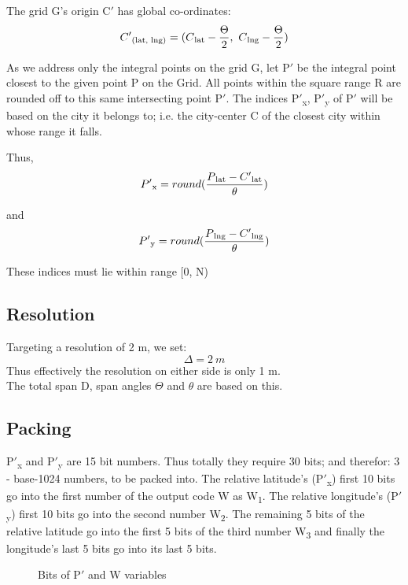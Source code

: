 \documentclass[conference]{IEEEtran}
\begin{document}
The grid G's origin C$'$ has global co-ordinates:
\begin{equation}C'\textsubscript{(lat, lng)} = ( C\textsubscript{lat} - \frac{\Theta}{2},\ C\textsubscript{lng} - \frac{\Theta}{2})\end{equation}

As we address only the integral points on the grid G, let P$'$ be the integral point closest to the given point P on the Grid.
All points within the square range R are rounded off to this same intersecting point P$'$.
The indices P$'$\textsubscript{x}, P$'$\textsubscript{y} of P$'$ will be based on the city it belongs to;
i.e. the city-center C of the closest city within whose range it falls.


Thus, \begin{equation}P'\textsubscript{x} = round(\frac{P\textsubscript{lat} - C'\textsubscript{lat}} {\theta})\end{equation}

and \begin{equation}P'\textsubscript{y}= round(\frac{P\textsubscript{lng} - C'\textsubscript{lng}} {\theta})\end{equation}

These indices must lie within range [0, N)

\subsection{Resolution}
Targeting a resolution of 2 m, we set:
\begin{equation}\Delta = 2 \ m\end{equation}
Thus effectively the resolution on either side is only 1 m.\\
The total span D, span angles $\Theta$ and {$\theta$} are based on this.

\subsection{Packing}
P$'$\textsubscript{x} and P$'$\textsubscript{y} are 15 bit numbers.
Thus totally they require 30 bits; and therefor: 3 - base-1024 numbers, to be packed into.
The relative latitude's (P$'$\textsubscript{x}) first 10 bits go into the first number of the output code W as W\textsubscript{1}. The relative longitude's (P$'$\textsubscript{y}) first 10 bits go into the second number W\textsubscript{2}. The remaining 5 bits of the relative latitude go into the first 5 bits of the third number W\textsubscript{3} and finally the longitude's last 5 bits go into its last 5 bits.
\begin{figure}[H]
\centerline{}
\caption{Bits of P$'$ and W variables}
\label{Packing}
\end{figure}
\end{document}
